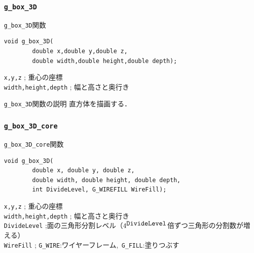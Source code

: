 \documentclass[a4paper,12pt]{jsarticle}%
\begin{document}
\subsubsection{\texttt{g\_box\_3D}}

\begin{itembox}[l]{\texttt{g\_box\_3D}関数}
\begin{verbatim}
void g_box_3D(
        double x,double y,double z,
        double width,double height,double depth);   
\end{verbatim}
\verb|x,y,z| ; 重心の座標\\
\verb|width,height,depth| ; 幅と高さと奥行き\\
\end{itembox}

\begin{itembox}[l]{\texttt{g\_box\_3D}関数の説明}
直方体を描画する．
\end{itembox}

\subsubsection{\texttt{g\_box\_3D\_core}}

\begin{itembox}[l]{\texttt{g\_box\_3D\_core}関数}
\begin{verbatim}
void g_box_3D(
        double x, double y, double z,
        double width, double height, double depth,
        int DivideLevel, G_WIREFILL WireFill);   
\end{verbatim}
\verb|x,y,z| ; 重心の座標\\
\verb|width,height,depth| ; 幅と高さと奥行き\\
\verb|DivideLevel| ;面の三角形分割レベル（$4^{\verb|DivideLevel|}$倍ずつ三角形の分割数が増える）\\
\verb|WireFill| ; \verb|G_WIRE|:ワイヤーフレーム,\ \verb|G_FILL|:塗りつぶす \\
\end{itembox}
\end{document}
